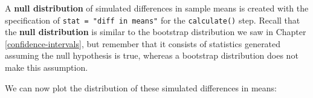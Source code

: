 \documentclass[12pt, krantz2,]{krantz}
\makeatletter
\newenvironment{Shaded}{\begin{snugshade}}{\end{snugshade}}
\newcommand{\DataTypeTok}[1]{\textcolor[rgb]{0.27,0.27,0.27}{#1}}
\newcommand{\DecValTok}[1]{\textcolor[rgb]{0.06,0.06,0.06}{#1}}
\newcommand{\KeywordTok}[1]{\textcolor[rgb]{0.27,0.27,0.27}{\textbf{#1}}}
\newcommand{\NormalTok}[1]{#1}
\newcommand{\OperatorTok}[1]{\textcolor[rgb]{0.43,0.43,0.43}{\textbf{#1}}}
\newcommand{\StringTok}[1]{\textcolor[rgb]{0.5,0.5,0.5}{#1}}
\newenvironment{kframe}{%
\medskip{}
\setlength{\fboxsep}{.8em}
 \def\at@end@of@kframe{}%
 \ifinner\ifhmode%
  \def\at@end@of@kframe{\end{minipage}}%
  \begin{minipage}{\columnwidth}%
 \fi\fi%
 \def\FrameCommand##1{\hskip\@totalleftmargin \hskip-\fboxsep
 \colorbox{shadecolor}{##1}\hskip-\fboxsep
     \hskip-\linewidth \hskip-\@totalleftmargin \hskip\columnwidth}%
 \MakeFramed {\advance\hsize-\width
   \@totalleftmargin\z@ \linewidth\hsize
   \@setminipage}}%
 {\par\unskip\endMakeFramed%
 \at@end@of@kframe}
\renewenvironment{Shaded}{\begin{kframe}}{\end{kframe}}
\makeatother
\begin{document}
\begin{Shaded}
\end{Shaded}

A \textbf{null distribution} of simulated differences in sample means is created with the specification of \texttt{stat\ =\ "diff\ in\ means"} for the \texttt{calculate()} step. Recall that the \textbf{null distribution} is similar to the bootstrap distribution we saw in Chapter \ref{confidence-intervals}, but remember that it consists of statistics generated assuming the null hypothesis is true, whereas a bootstrap distribution does not make this assumption.

\begin{Shaded}
\end{Shaded}

We can now plot the distribution of these simulated differences in means:

\begin{Shaded}
\end{Shaded}
\end{document}
